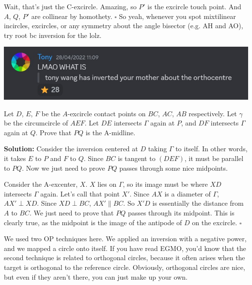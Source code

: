 \documentclass{scrartcl}
\begin{document}
Wait, that's just the C-excircle. \newline
Amazing, so $P'$ is the excircle touch point. And $A$, $Q$, $P'$ are collinear by homothety. $\square$\newline
So yeah, whenever you spot mixtilinear incircles, excircles, or any symmetry about the angle bisector (e.g. AH and AO), try root bc inversion for the lolz.

\begin{center}
    \includegraphics[scale=0.8]{tony_quote.jpg}
\end{center}
\begin{problem} Let $D$, $E$, $F$ be the $A$-excircle contact points on $BC$, $AC$, $AB$ respectively. Let $\gamma$ be the circumcircle of $AEF$. Let $DE$ intersects $\Gamma$ again at $P$, and $DF$ intersects $\Gamma$ again at $Q$. Prove that $PQ$ is the A-midline. 
\end{problem}
\textbf{Solution:} Consider the inversion centered at $D$ taking $\Gamma$ to itself. In other words, it takes $E$ to $P$ and $F$ to $Q$. Since $BC$ is tangent to $(DEF)$, it must be parallel to $PQ$. Now we just need to prove $PQ$ passes through some nice midpoints. 

Consider the A-excenter, $X$. $X$ lies on $\Gamma$, so its image must be where $XD$ intersects $\Gamma$ again. Let's call that point $X'$. Since $AX$ is a diameter of $\Gamma$, $AX' \perp XD$. Since $XD \perp BC$, $AX' \parallel BC$. So $X'D$ is essentially the distance from $A$ to $BC$. We just need to prove that $PQ$ passes through its midpoint. This is clearly true, as the midpoint is the image of the antipode of $D$ on the excircle. $\square$\newline 

We used two OP techniques here. We applied an inversion with a negative power, and we mapped a circle onto itself. If you have read EGMO, you'd know that the second technique is related to orthogonal circles, because it often arises when the target is orthogonal to the reference circle. Obviously, orthogonal circles are nice, but even if they aren't there, you can just make up your own. \newline
\end{document}
